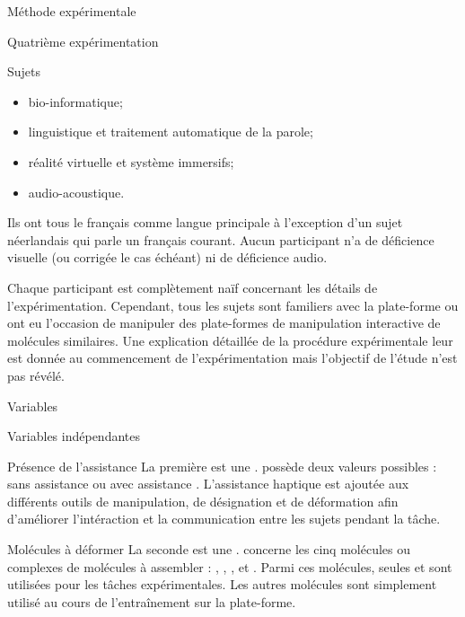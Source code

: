 \documentclass[myfrancais,ngerman,english,frenchb]{mythesis}
\begin{document}
\begin{mychapter}{Méthode expérimentale}
\begin{mysection}{Quatrième expérimentation}
\begin{mysubsection}{Sujets}
				\begin{itemize}
					\item bio-informatique;
					\item linguistique et traitement automatique de la parole;
					\item réalité virtuelle et système immersifs;
					\item audio-acoustique.
				\end{itemize}
				Ils ont tous le français comme langue principale à l'exception d'un sujet néerlandais qui parle un français courant.
				Aucun participant n'a de déficience visuelle (ou corrigée le cas échéant) ni de déficience audio.

				Chaque participant est complètement naïf concernant les détails de l'expérimentation.
				Cependant, tous les sujets sont familiers avec la plate-forme \myShaddock ou ont eu l'occasion de manipuler des plate-formes de manipulation interactive de molécules similaires.
				Une explication détaillée de la procédure expérimentale leur est donnée au commencement de l'expérimentation mais l'objectif de l'étude n'est pas révélé.
			\end{mysubsection}
			\begin{mysubsection}{Variables}
				\begin{mysubsubsection}{Variables indépendantes}
					\begin{myparagraph}{ Présence de l'assistance}
						La première  est une .
						 possède deux valeurs possibles : \og sans assistance \fg ou \og avec assistance \fg.
						L'assistance haptique est ajoutée aux différents outils de manipulation, de désignation et de déformation afin d'améliorer l'intéraction et la communication entre les sujets pendant la tâche.
					\end{myparagraph}
					\begin{myparagraph}{ Molécules à déformer}
						La seconde  est une \myglos{glo-VariableIntraSujets}.
						 concerne les cinq molécules ou complexes de molécules à assembler : \og \myTRPCAGE \fg, \og \myPrion \fg, \og \myUbiquitin \fg, \og \myTRPZIPPER \fg et \og \myNusENusG \fg.
						Parmi ces molécules, seules \myUbiquitin et \myNusENusG sont utilisées pour les tâches expérimentales.
						Les autres molécules sont simplement utilisé au cours de l'entraînement sur la plate-forme.

\end{myparagraph}
\end{mysubsubsection}
\end{mysubsection}
\end{mysection}
\end{mychapter}
\end{document}
